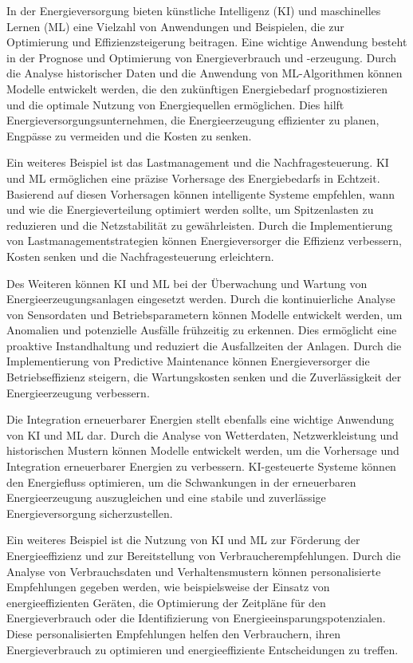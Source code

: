 In der Energieversorgung bieten künstliche Intelligenz (KI) und maschinelles
Lernen (ML) eine Vielzahl von Anwendungen und Beispielen, die zur Optimierung
und Effizienzsteigerung beitragen. Eine wichtige Anwendung besteht in der
Prognose und Optimierung von Energieverbrauch und -erzeugung. Durch die Analyse
historischer Daten und die Anwendung von ML-Algorithmen können Modelle
entwickelt werden, die den zukünftigen Energiebedarf prognostizieren und die
optimale Nutzung von Energiequellen ermöglichen. Dies hilft
Energieversorgungsunternehmen, die Energieerzeugung effizienter zu planen,
Engpässe zu vermeiden und die Kosten zu senken.

Ein weiteres Beispiel ist das Lastmanagement und die Nachfragesteuerung. KI und
ML ermöglichen eine präzise Vorhersage des Energiebedarfs in Echtzeit.
Basierend auf diesen Vorhersagen können intelligente Systeme empfehlen, wann
und wie die Energieverteilung optimiert werden sollte, um Spitzenlasten zu
reduzieren und die Netzstabilität zu gewährleisten. Durch die Implementierung
von Lastmanagementstrategien können Energieversorger die Effizienz verbessern,
Kosten senken und die Nachfragesteuerung erleichtern.

Des Weiteren können KI und ML bei der Überwachung und Wartung von
Energieerzeugungsanlagen eingesetzt werden. Durch die kontinuierliche Analyse
von Sensordaten und Betriebsparametern können Modelle entwickelt werden, um
Anomalien und potenzielle Ausfälle frühzeitig zu erkennen. Dies ermöglicht eine
proaktive Instandhaltung und reduziert die Ausfallzeiten der Anlagen. Durch die
Implementierung von Predictive Maintenance können Energieversorger die
Betriebseffizienz steigern, die Wartungskosten senken und die Zuverlässigkeit
der Energieerzeugung verbessern.

Die Integration erneuerbarer Energien stellt ebenfalls eine wichtige Anwendung
von KI und ML dar. Durch die Analyse von Wetterdaten, Netzwerkleistung und
historischen Mustern können Modelle entwickelt werden, um die Vorhersage und
Integration erneuerbarer Energien zu verbessern. KI-gesteuerte Systeme können
den Energiefluss optimieren, um die Schwankungen in der erneuerbaren
Energieerzeugung auszugleichen und eine stabile und zuverlässige
Energieversorgung sicherzustellen.

Ein weiteres Beispiel ist die Nutzung von KI und ML zur Förderung der
Energieeffizienz und zur Bereitstellung von Verbraucherempfehlungen. Durch die
Analyse von Verbrauchsdaten und Verhaltensmustern können personalisierte
Empfehlungen gegeben werden, wie beispielsweise der Einsatz von
energieeffizienten Geräten, die Optimierung der Zeitpläne für den
Energieverbrauch oder die Identifizierung von Energieeinsparungspotenzialen.
Diese personalisierten Empfehlungen helfen den Verbrauchern, ihren
Energieverbrauch zu optimieren und energieeffiziente Entscheidungen zu treffen.

